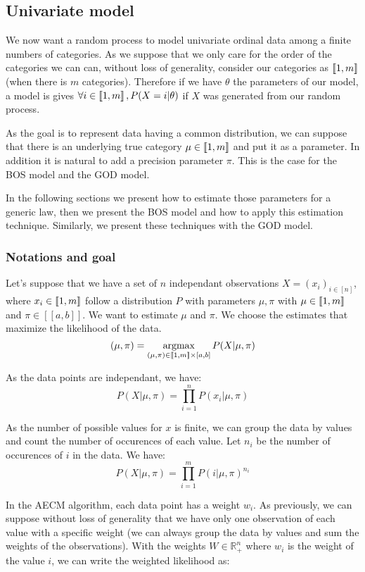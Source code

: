 \subsection{Univariate model}
\label{sec:univariate}

We now want a random process to model univariate ordinal data among a finite numbers of categories.
As we suppose that we only care for the order of the categories we can can, without loss of generality, consider our categories as $\left\llbracket1, m\right\rrbracket$ (when there is $m$ categories). Therefore if we have $\theta$ the parameters of our model, a model is gives $\forall i \in \left\llbracket1, m\right\rrbracket, P(X = i | \theta)$ if $X$ was generated from our random process. 

As the goal is to represent data having a common distribution, we can suppose that there is an underlying true category $\mu \in \left\llbracket1, m\right\rrbracket$ and put it as a parameter. In addition it is natural to add a precision parameter $\pi$. This is the case for the BOS model and the GOD model. 

In the following sections we present how to estimate those parameters for a generic law, then we present the BOS model and how to apply this estimation technique. Similarly, we present these techniques with the GOD model.


\subsubsection{Notations and goal}

Let's suppose that we have a set of $n$ independant observations $X = (x_i)_{i \in [n]}$, where $x_i \in \left\llbracket1, m\right\rrbracket$ follow a distribution $P$ with parameters $\mu, \pi$ with $\mu \in \left\llbracket1, m\right\rrbracket$ and $\pi \in [[a, b]]$. We want to estimate $\mu$ and $\pi$. We choose the estimates that maximize the likelihood of the data.
$$(\mu, \pi) = \operatorname*{argmax}_{(\mu, \pi) \in \left\llbracket1, m\right\rrbracket \times [a, b]} P(X | \mu, \pi)$$

As the data points are independant, we have:
$$P(X | \mu, \pi) = \prod_{i=1}^n P(x_i | \mu, \pi)$$

As the number of possible values for $x$ is finite, we can group the data by values and count the number of occurences of each value. Let $n_i$ be the number of occurences of $i$ in the data. We have:
$$P(X | \mu, \pi) = \prod_{i=1}^m P(i | \mu, \pi)^{n_i}$$

In the AECM algorithm, each data point has a weight $w_i$. As previously, we can suppose without loss of generality that we have only one observation of each value with a specific weight (we can always group the data by values and sum the weights of the observations). With the weights $W \in \mathbb{R}_+^n$ where $w_i$ is the weight of the value $i$, we can write the weighted likelihood as:

